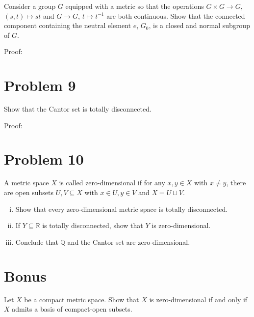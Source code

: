 \documentclass[8pt]{extarticle}
\newcommand{\Q}{\mathbb{Q}}
\newcommand{\R}{\mathbb{R}}
\begin{document}
  Consider a group $G$ equipped with a metric so that the operations $G\times G \rightarrow G$, $(s,t)\mapsto st$ and $G\rightarrow G$, $t\mapsto t^{-1}$ are both continuous. Show that the connected component containing the neutral element $e$, $G_0$, is a closed and normal subgroup of $G$.
  \begin{description}
    \item[Proof:] 
  \end{description}
  \section{Problem 9}%
  Show that the Cantor set is totally disconnected.
  \begin{description}
    \item[Proof:] 
  \end{description}
  \section{Problem 10}%
  A metric space $X$ is called zero-dimensional if for any $x,y\in X$ with $x\neq y$, there are open subsets $U,V\subseteq X$ with $x\in U,y\in V$ and $X = U\sqcup V$.
  \begin{enumerate}[(i)]
    \item Show that every zero-dimensional metric space is totally disconnected.
    \item If $Y\subseteq \R$ is totally disconnected, show that $Y$ is zero-dimensional.
    \item Conclude that $\Q$ and the Cantor set are zero-dimensional.
  \end{enumerate}
  \section{Bonus}%
  Let $X$ be a compact metric space. Show that $X$ is zero-dimensional if and only if $X$ admits a basis of compact-open subsets.
\end{document}
